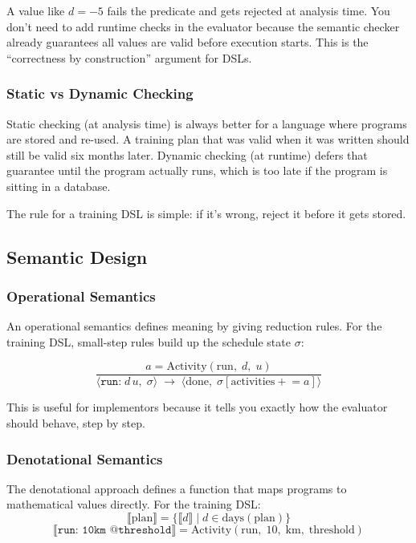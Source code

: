 A value like $d = -5$ fails the predicate and gets rejected at analysis time. You don't
need to add runtime checks in the evaluator because the semantic checker already guarantees
all values are valid before execution starts. This is the ``correctness by construction''
argument for DSLs.

\subsubsection{Static vs Dynamic Checking}

Static checking (at analysis time) is always better for a language where programs are
stored and re-used. A training plan that was valid when it was written should still be
valid six months later. Dynamic checking (at runtime) defers that guarantee until the
program actually runs, which is too late if the program is sitting in a database.

The rule for a training DSL is simple: if it's wrong, reject it before it gets stored.

\subsection{Semantic Design}

\subsubsection{Operational Semantics}

An operational semantics defines meaning by giving reduction rules. For the training DSL,
small-step rules build up the schedule state $\sigma$:

\[
  \frac{a = \text{Activity}(\text{run},\; d,\; u)}
       {\langle \texttt{run:}\; d\,u,\; \sigma \rangle \;\to\;
        \langle \text{done},\; \sigma[\text{activities} \mathrel{+}= a] \rangle}
\]

This is useful for implementors because it tells you exactly how the evaluator should
behave, step by step.

\subsubsection{Denotational Semantics}

The denotational approach defines a function that maps programs to mathematical values
directly. For the training DSL:
\[
  \llbracket \text{plan} \rrbracket = \{ \llbracket d \rrbracket \mid d \in \text{days}(\text{plan}) \}
\]
\[
  \llbracket \texttt{run: 10km @threshold} \rrbracket =
  \text{Activity}(\text{run},\; 10,\; \text{km},\; \text{threshold})
\]

